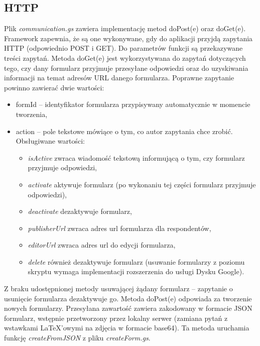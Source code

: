 \subsection{HTTP}
Plik \textit{communication.gs} zawiera implementację metod doPost(e) oraz doGet(e). Framework zapewnia, że są one wykonywane, gdy do aplikacji przyjdą zapytania HTTP (odpowiednio POST i GET). Do parametrów funkcji są przekazywane treści zapytań.
\ind Metoda doGet(e) jest wykorzystywana do zapytań dotyczących tego, czy dany formularz przyjmuje przesyłane odpowiedzi oraz do uzyskiwania informacji na temat adresów URL danego formularza.  Poprawne zapytanie powinno zawierać dwie wartości:
\begin{itemize}
\item formId -- identyfikator formularza przypisywany automatycznie w momencie tworzenia,
\item action -- pole tekstowe mówiące o tym, co autor zapytania chce zrobić. Obsługiwane wartości:
\begin{itemize}
\item \textit{isActive} zwraca wiadomość tekstową informującą o tym, czy formularz przyjmuje odpowiedzi,
\item \textit{activate} aktywuje formularz (po wykonaniu tej części formularz przyjmuje odpowiedzi),
\item \textit{deactivate} dezaktywuje formularz,
\item \textit{publisherUrl} zwraca adres url formularza dla respondentów,
\item \textit{editorUrl} zwraca adres url do edycji formularza,
\item \textit{delete} również dezaktywuje formularz (usuwanie formularzy z poziomu skryptu wymaga implementacji rozszerzenia do usługi Dysku Google).
\end{itemize}
\end{itemize}
Z braku udostępnionej metody usuwającej żądany formularz -- zapytanie o usunięcie formularza dezaktywuje go. 
\ind Metoda doPost(e) odpowiada  za tworzenie nowych formularzy. Przesyłana zawartość zawiera zakodowany w formacie JSON formularz, wstępnie przetworzony przez lokalny serwer (zamiana pytań z wstawkami \LaTeX{}'owymi na zdjęcia w formacie base64). Ta metoda uruchamia funkcję \textit{createFromJSON} z pliku \textit{createForm.gs}.
